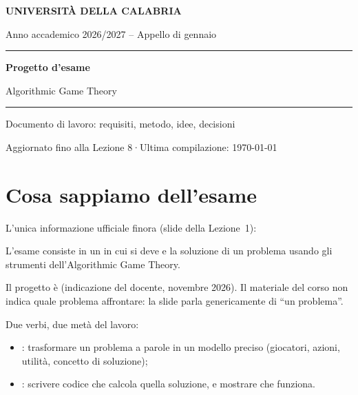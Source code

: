 \documentclass[11pt, a4paper, oneside, openany]{book}
\begin{document}
\frontmatter

\hypersetup{pageanchor=false}
\begin{titlepage}
  \centering
  \vspace*{3cm}
  {\sffamily\bfseries\color{unical}\large UNIVERSITÀ DELLA CALABRIA\par}
  \vspace{0.3cm}
  {\sffamily\color{grigio}Anno accademico 2026/2027 -- Appello di gennaio\par}
  \vspace{2.5cm}
  {\color{blu}\rule{\linewidth}{1.2pt}\par}
  \vspace{0.6cm}
  {\sffamily\bfseries\Huge\color{blu} Progetto d'esame\par}
  \vspace{0.4cm}
  {\sffamily\Large Algorithmic Game Theory\par}
  \vspace{0.6cm}
  {\color{blu}\rule{\linewidth}{1.2pt}\par}
  \vspace{1.5cm}
  {\large Documento di lavoro: requisiti, metodo, idee, decisioni\par}
  \vfill
  {\small\color{grigio} Aggiornato fino alla Lezione 8\quad·\quad Ultima compilazione: \today\par}
\end{titlepage}
\hypersetup{pageanchor=true}

\tableofcontents

\mainmatter
\chapter{Cosa sappiamo dell'esame}

L'unica informazione ufficiale finora (slide della Lezione~1):

\begin{definizione}[Esame]
L'esame consiste in un  in cui si deve  e 
la soluzione di un problema usando gli strumenti dell'Algorithmic Game Theory.
\end{definizione}

Il progetto è  (indicazione del docente, novembre 2026). Il materiale del corso
non indica quale problema affrontare: la slide parla genericamente di ``un problema''.

Due verbi, due metà del lavoro:
\begin{itemize}
  \item {}: trasformare un problema a parole in un modello preciso
        (giocatori, azioni, utilità, concetto di soluzione);
  \item {}: scrivere codice che calcola quella soluzione, e mostrare che funziona.
\end{itemize}
\end{document}
